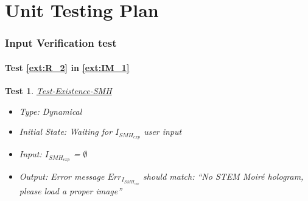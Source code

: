 \documentclass[12pt, titlepage]{article}
\newtheorem{Test}{Test}
\begin{document}



					
					
					
					
					

					
					
					
					



				
\section{Unit Testing Plan}
		

\subsubsection{Input Verification test}

\paragraph{Test \cref{ext:R_2} in \cref{ext:IM_1}}

\begin{Test}\normalfont\underline{Test-Existence-SMH}
\begin{itemize}
\item Type: Dynamical
\item Initial State: Waiting for $I_{SMH_{exp}}$ user input
\item Input: $I_{SMH_{exp}}$ = $\emptyset$
\item Output: Error message $Err_{I_{SMH_{exp}}}$ should match: \enquote{No STEM Moir{\'e} hologram, please load a proper image}
\end{itemize}
\end{Test}
\end{document}
